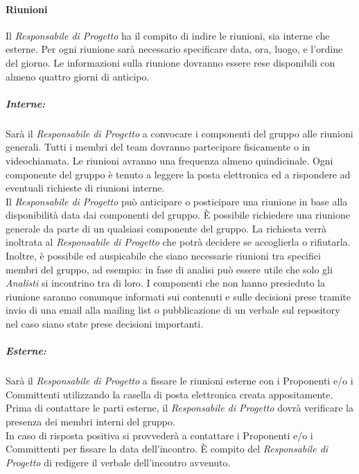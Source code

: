 		\paragraph{Riunioni}
		Il \textit{Responsabile di Progetto} ha il compito di indire le riunioni, sia interne che esterne. Per ogni riunione sarà necessario specificare data, ora, luogo, e l'ordine del giorno. Le informazioni sulla riunione dovranno essere rese disponibili con almeno quattro giorni di anticipo.
		\subparagraph{Interne:}
		Sarà il \textit{Responsabile di Progetto} a convocare i componenti del gruppo alle riunioni generali. Tutti i membri del team dovranno partecipare fisicamente o in videochiamata. Le riunioni avranno una frequenza almeno quindicinale. Ogni componente del gruppo è tenuto a leggere la posta elettronica ed a rispondere ad eventuali richieste di riunioni interne. \\
		Il \textit{Responsabile di Progetto} può anticipare o posticipare una riunione in base alla disponibilità data dai componenti del gruppo. È possibile richiedere una riunione generale da parte di un qualsiasi componente del gruppo. La richiesta verrà inoltrata al \textit{Responsabile di Progetto} che potrà decidere se accoglierla o rifiutarla.\\
		Inoltre, è possibile ed auspicabile che siano necessarie riunioni tra specifici membri del gruppo, ad esempio: in fase di analisi può essere utile che solo gli \textit{Analisti} si incontrino tra di loro. I componenti che non hanno presieduto la riunione saranno comunque informati sui contenuti e sulle decisioni prese tramite invio di una email alla mailing list o pubblicazione di un \gls{verbale} sul \gls{repository} nel caso siano state prese decisioni importanti.
		\subparagraph{Esterne:}
		Sarà il \textit{Responsabile di Progetto} a fissare le riunioni esterne con i Proponenti e/o i Committenti utilizzando la casella di posta elettronica creata appositamente. Prima di contattare le parti esterne, il \textit{Responsabile di Progetto} dovrà verificare la presenza dei membri interni del gruppo. \\
		In caso di risposta positiva si provvederà a contattare i Proponenti e/o i Committenti per fissare la data dell'incontro.
		È compito del \textit{Responsabile di Progetto} di redigere il \gls{verbale} dell'incontro avvenuto.
		
